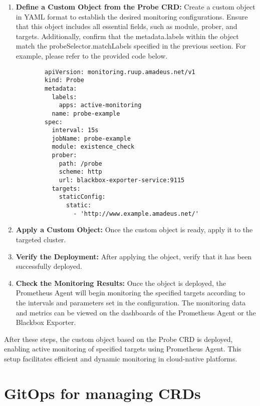 \begin{enumerate}
    \item \textbf{Define a Custom Object from the Probe \ac{CRD}:}
    Create a custom object in YAML format to establish the desired monitoring configurations. Ensure that this object includes all essential fields, such as module, prober, and targets. Additionally, confirm that the metadata.labels within the object match the probeSelector.matchLabels specified in the previous section. For example, please refer to the provided code below. 
      \begin{lstlisting}
        apiVersion: monitoring.ruup.amadeus.net/v1
        kind: Probe
        metadata:
          labels:
            apps: active-monitoring
          name: probe-example
        spec:
          interval: 15s
          jobName: probe-example
          module: existence_check
          prober:
            path: /probe
            scheme: http
            url: blackbox-exporter-service:9115
          targets:
            staticConfig:
              static:
                - 'http://www.example.amadeus.net/'
      \end{lstlisting}
    \item \textbf{Apply a Custom Object:}
    Once the custom object is ready, apply it to the targeted cluster. 
    \item \textbf{Verify the Deployment:}
    After applying the object, verify that it has been successfully deployed. 
    \item \textbf{Check the Monitoring Results:}
    Once the object is deployed, the Prometheus Agent will begin monitoring the specified targets according to the intervals and parameters set in the configuration. The monitoring data and metrics can be viewed on the dashboards of the Prometheus Agent or the Blackbox Exporter. 
\end{enumerate}

After these steps, the custom object based on the Probe \ac{CRD} is deployed, enabling active monitoring of specified targets using Prometheus Agent. This setup facilitates efficient and dynamic monitoring in cloud-native platforms. 

\section{GitOps for managing CRDs}


